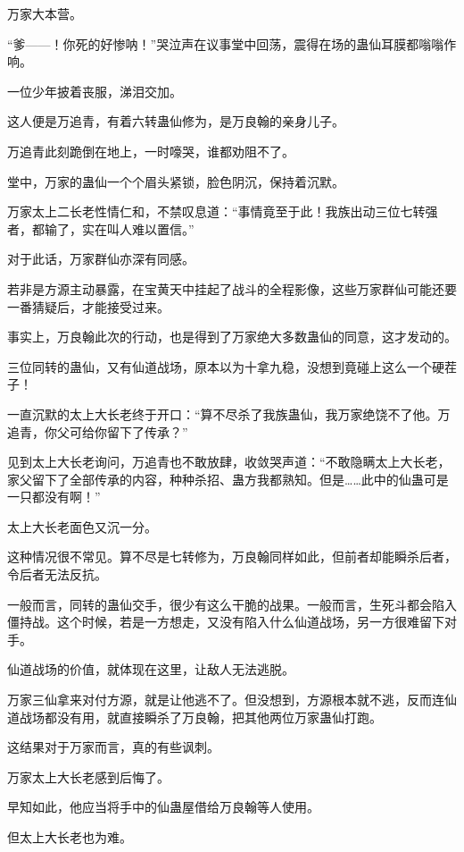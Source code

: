 
\begin{this_body}

万家大本营。

“爹——！你死的好惨呐！”哭泣声在议事堂中回荡，震得在场的蛊仙耳膜都嗡嗡作响。

一位少年披着丧服，涕泪交加。

这人便是万追青，有着六转蛊仙修为，是万良翰的亲身儿子。

万追青此刻跪倒在地上，一时嚎哭，谁都劝阻不了。

堂中，万家的蛊仙一个个眉头紧锁，脸色阴沉，保持着沉默。

万家太上二长老性情仁和，不禁叹息道：“事情竟至于此！我族出动三位七转强者，都输了，实在叫人难以置信。”

对于此话，万家群仙亦深有同感。

若非是方源主动暴露，在宝黄天中挂起了战斗的全程影像，这些万家群仙可能还要一番猜疑后，才能接受过来。

事实上，万良翰此次的行动，也是得到了万家绝大多数蛊仙的同意，这才发动的。

三位同转的蛊仙，又有仙道战场，原本以为十拿九稳，没想到竟碰上这么一个硬茬子！

一直沉默的太上大长老终于开口：“算不尽杀了我族蛊仙，我万家绝饶不了他。万追青，你父可给你留下了传承？”

见到太上大长老询问，万追青也不敢放肆，收敛哭声道：“不敢隐瞒太上大长老，家父留下了全部传承的内容，种种杀招、蛊方我都熟知。但是……此中的仙蛊可是一只都没有啊！”

太上大长老面色又沉一分。

这种情况很不常见。算不尽是七转修为，万良翰同样如此，但前者却能瞬杀后者，令后者无法反抗。

一般而言，同转的蛊仙交手，很少有这么干脆的战果。一般而言，生死斗都会陷入僵持战。这个时候，若是一方想走，又没有陷入什么仙道战场，另一方很难留下对手。

仙道战场的价值，就体现在这里，让敌人无法逃脱。

万家三仙拿来对付方源，就是让他逃不了。但没想到，方源根本就不逃，反而连仙道战场都没有用，就直接瞬杀了万良翰，把其他两位万家蛊仙打跑。

这结果对于万家而言，真的有些讽刺。

万家太上大长老感到后悔了。

早知如此，他应当将手中的仙蛊屋借给万良翰等人使用。

但太上大长老也为难。


\end{this_body}
